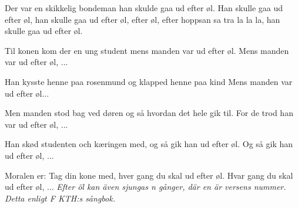 \vspace{10pt}
\revrpt Der var en skikkelig bondeman
han skulde gaa ud efter øl. \rpt
Han skulle gaa ud efter øl,
han skulle gaa ud efter øl,
efter øl, efter hoppsan sa tra la la la,
han skulle gaa ud efter øl.

\revrpt Til konen kom der en ung student
mens manden var ud efter øl. \rpt
Mens manden var ud efter øl, ...

\revrpt Han kysste henne paa rosenmund
og klapped henne paa kind \rpt
Mens manden var ud efter øl...

\revrpt Men manden stod bag ved døren og så
hvordan det hele gik til. \rpt
For de trod han var ud efter øl, ...

\revrpt Han skød studenten och kæringen med,
og så gik han ud efter øl. \rpt
Og så gik han ud efter øl, ...

\revrpt Moralen er: Tag din kone med,
hver gang du skal ud efter øl. \rpt
Hvar gang du skal ud efter øl, ...
\vspace{10pt}
{\footnotesize\textit{Efter öl kan även sjungas n gånger, där en är versens nummer.\\
Detta enligt F KTH:s sångbok.}}

